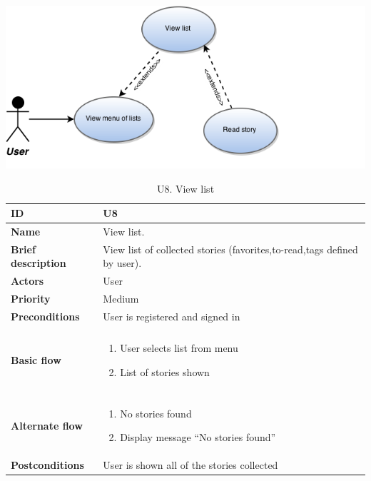 \begin{table}[htp]
	\includegraphics[width=\textwidth]{fig/U8}
	\centering
	\caption{U8. View list}
	\begin{tabular}[b]{|l | l|}\hline
		\textbf{ID} 				& U8									\\\hline
		\textbf{Name} 				& View list.							\\\hline
		\textbf{Brief description}	& View list of collected stories (favorites,to-read,tags defined by user). 			\\\hline
		\textbf{Actors} 			& User									\\\hline
		\textbf{Priority}			& Medium								\\\hline
		\textbf{Preconditions}		& User is registered and signed in		\\\hline&\\[-2ex]
		\textbf{Basic flow}			& \begin{minipage}{5in}
			\begin{enumerate}[noitemsep]
				\item User selects list from menu
				\item List of stories shown
			\end{enumerate}						
		\end{minipage}						\\\hline&\\[-2ex]
		\textbf{Alternate flow}		& \begin{minipage}{5in}
			\begin{enumerate}[noitemsep]
				\item No stories found
				\item Display message “No stories found”
			\end{enumerate}
		\end{minipage}							\\\hline
		\textbf{Postconditions}		& User is shown all of the stories collected\\\hline
	\end{tabular}
\end{table}

